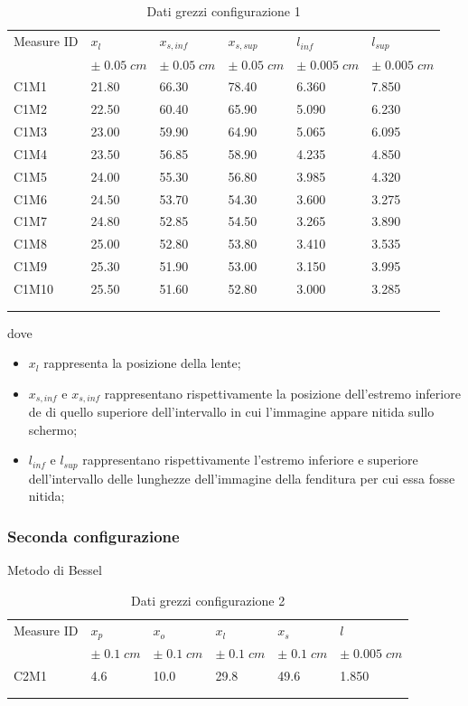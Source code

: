 \documentclass[11pt,a4paper]{article}
\begin{document}
\begin{longtable}[]{@{}llllll@{}}
    \toprule
    Measure ID & $x_l$ & $x_{s,inf}$ & $x_{s,sup}$ & $l_{inf}$ & $l_{sup}$ \tabularnewline
     & $\pm \; 0.05 \; cm$ & $\pm \; 0.05 \; cm$ & $\pm \; 0.05 \; cm$ & $\pm \; 0.005 \; cm$ & $\pm \; 0.005 \; cm$ \tabularnewline
    \midrule
    \endhead
    C1M1 & 21.80 & 66.30 & 78.40 & 6.360 & 7.850 \tabularnewline
    C1M2 & 22.50 & 60.40 & 65.90 & 5.090 & 6.230 \tabularnewline
    C1M3 & 23.00 & 59.90 & 64.90 & 5.065 & 6.095 \tabularnewline
    C1M4 & 23.50 & 56.85 & 58.90 & 4.235 & 4.850 \tabularnewline
    C1M5 & 24.00 & 55.30 & 56.80 & 3.985 & 4.320 \tabularnewline
    C1M6 & 24.50 & 53.70 & 54.30 & 3.600 & 3.275 \tabularnewline
    C1M7 & 24.80 & 52.85 & 54.50 & 3.265 & 3.890 \tabularnewline
    C1M8 & 25.00 & 52.80 & 53.80 & 3.410 & 3.535 \tabularnewline
    C1M9 & 25.30 & 51.90 & 53.00 & 3.150 & 3.995 \tabularnewline
    C1M10 & 25.50 & 51.60 & 52.80 & 3.000 & 3.285 \tabularnewline
    \bottomrule
    \label{tab:dconf1}
    \\
    \caption{Dati grezzi configurazione 1}
\end{longtable}

dove
\begin{itemize}
    \item $x_l$ rappresenta la posizione della lente;
    \item $x_{s,inf}$ e $x_{s,inf}$ rappresentano rispettivamente la posizione dell'estremo inferiore de di quello superiore dell'intervallo in cui l'immagine appare nitida sullo schermo;
    \item $l_{inf}$ e $l_{sup}$ rappresentano rispettivamente l'estremo inferiore e superiore dell'intervallo delle lunghezze dell'immagine della fenditura per cui essa fosse nitida;
\end{itemize}

\subsubsection{Seconda configurazione}
Metodo di Bessel

\begin{longtable}[]{@{}llllll@{}}
    \toprule
    Measure ID & $x_p$ & $x_o$ & $x_l$ & $x_s$ &  $l$ \tabularnewline
      & $\pm \; 0.1 \; cm$ & $\pm \; 0.1 \; cm$ & $\pm \; 0.1 \; cm$ & $\pm \; 0.1 \; cm$ & $\pm \; 0.005 \; cm$ \tabularnewline
    \midrule
    \endhead
    C2M1 & 4.6 & 10.0 & 29.8 & 49.6 & 1.850 \tabularnewline
    \bottomrule
    \label{tab:dati-bessel}
    \\
    \caption{Dati grezzi configurazione 2}
\end{longtable}
\end{document}

